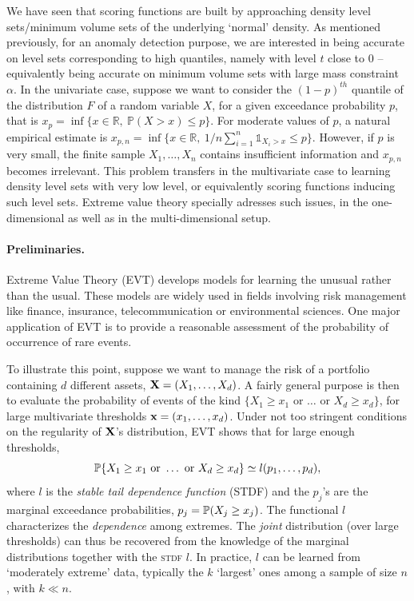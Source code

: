 We have seen that scoring functions are built
by approaching density level sets/minimum volume sets of the underlying `normal' density. As mentioned previously, for an anomaly detection purpose, we are interested in being accurate on level sets corresponding to high quantiles, namely with level $t$ close to $0$ -- equivalently being accurate on minimum volume sets with large mass constraint $\alpha$.  
%
In the univariate case, suppose we want to consider the $(1-p)^{th}$ quantile of the distribution $F$ of a random variable $X$, for a given exceedance probability $p$, that is $x_p = \inf\{x \in \mathbb{R},~ \mathbb{P}(X > x) \le p\}$. For moderate values of $p$, a natural empirical estimate is $x_{p,n} = \inf\{x \in \mathbb{R},~ 1/n \sum_{i=1}^n \mathds{1}_{X_i > x}\le p\}$.
However,  if $p$ is very small, the finite  sample $X_1,\ldots, X_n$  contains insufficient information and $x_{p,n}$ becomes irrelevant.
%
This problem transfers in the multivariate case to learning density level sets with very low level, or equivalently scoring functions inducing such level sets.
%
Extreme value theory specially adresses such issues, in the one-dimensional as well as in the multi-dimensional setup.



\paragraph{Preliminaries.}
Extreme Value Theory (\textsc{EVT}) develops models for learning the unusual rather than the usual. These models are widely used in fields involving risk management like finance, insurance, telecommunication or environmental sciences. One major application of \textsc{EVT} is to provide a reasonable assessment of the probability of occurrence of rare events. 

To illustrate this point, suppose we want to manage the risk of a portfolio containing $d$ different assets, $\mb X = (X_1,\ldots,X_d)$. A fairly general purpose is then to evaluate the probability of events of the kind $\{X_1 \ge x_1 \text{ or }  \dotsc \text{ or } X_d\ge x_d \}$, for large multivariate thresholds $\mb x=(x_1,\ldots,x_d)$. Under not too stringent conditions on the regularity of $\mb X$'s  distribution, \textsc{EVT} shows that for large enough thresholds, 
\[
\P\{X_1 \ge x_1 \text{ or }  \dotsc \text{ or }
X_d\ge x_d \} \simeq 
l(p_1,\ldots,p_d), 
\]  
where $l$ is the  \emph{stable tail dependence function} (STDF) and the $p_j$'s  are the marginal exceedance probabilities, $p_j = \P(X_j\ge x_j)$. The functional $l$ characterizes the \emph{dependence} among extremes. The \emph{joint} distribution (over large thresholds) can thus be recovered from the knowledge of the marginal distributions  together with the \textsc{stdf} $l$. In practice, $l$ can be learned from `moderately extreme' data, typically the $k$ `largest' ones among a sample of size $n$, with $k\ll n$.


